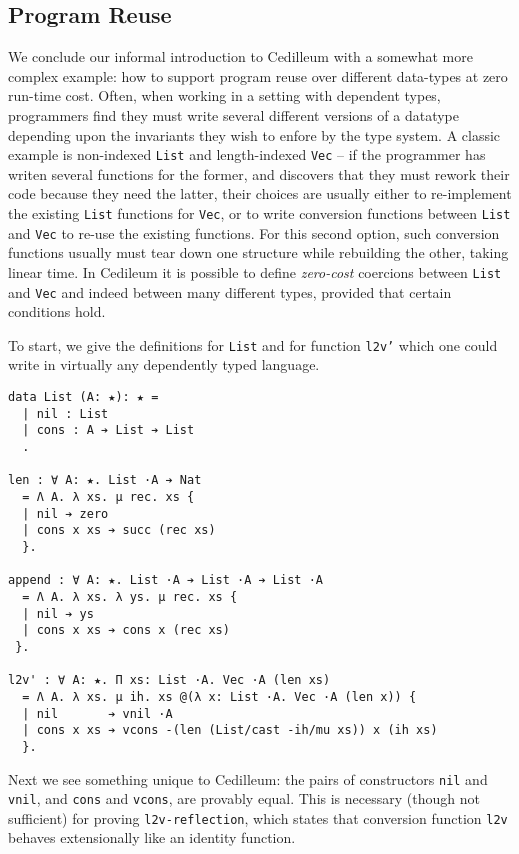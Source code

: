 \documentclass{article}
\begin{document}
\subsection{Program Reuse}
We conclude our informal introduction to Cedilleum with a somewhat more complex
example: how to support program reuse over different data-types at zero
run-time cost. Often, when working in a setting with dependent types,
programmers find they must write several different versions of a datatype
depending upon the invariants they wish to enfore by the type system. A classic
example is non-indexed \texttt{List} and length-indexed \texttt{Vec} -- if the
programmer has writen several functions for the former, and discovers that they
must rework their code because they need the latter, their choices are usually
either to re-implement the existing \texttt{List} functions for \texttt{Vec}, or to write
conversion functions between \texttt{List} and \texttt{Vec} to re-use the
existing functions. For this second option, such conversion functions usually must
tear down one structure while rebuilding the other, taking linear time. In
Cedileum it is possible to define \textit{zero-cost} coercions between
\texttt{List} and \texttt{Vec} and indeed between many different types, provided
that certain conditions hold.

To start, we give the definitions for \texttt{List} and for function
\texttt{l2v'} which one could write in virtually any dependently typed language.

\begin{verbatim}
data List (A: ★): ★ =
  | nil : List
  | cons : A ➔ List ➔ List
  .

len : ∀ A: ★. List ·A ➔ Nat
  = Λ A. λ xs. μ rec. xs {
  | nil ➔ zero
  | cons x xs ➔ succ (rec xs)
  }.

append : ∀ A: ★. List ·A ➔ List ·A ➔ List ·A
  = Λ A. λ xs. λ ys. μ rec. xs {
  | nil ➔ ys
  | cons x xs ➔ cons x (rec xs)
 }.

l2v' : ∀ A: ★. Π xs: List ·A. Vec ·A (len xs)
  = Λ A. λ xs. μ ih. xs @(λ x: List ·A. Vec ·A (len x)) {
  | nil       ➔ vnil ·A
  | cons x xs ➔ vcons -(len (List/cast -ih/mu xs)) x (ih xs)
  }.
\end{verbatim}

Next we see something unique to Cedilleum: the pairs of constructors \texttt{nil}
and \texttt{vnil}, and \texttt{cons} and \texttt{vcons}, are provably equal.
This is necessary (though not sufficient) for proving
\texttt{l2v-reflection}, which states that conversion function \texttt{l2v}
behaves extensionally like an identity function.
\end{document}

